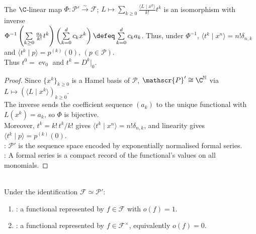 \begin{theorem} \label{thm:umbral-functional-series-isomorphism} \\
The $\C$-linear map $\Phi:\mathscr{P}'\xrightarrow{\sim}\mathscr{F}$; $L\longmapsto \sum\limits_{k\geq0}\frac{\langle L\mid x^k\rangle}{k!}t^k$ is an isomorphism with inverse\\
$\Phi^{-1}\left(\sum\limits_{k\geq0}\frac{a_k}{k!}t^k\right) \left(\sum\limits_{k=0}^{d}c_kx^k\right)\defeq \sum\limits_{k=0}^{d}c_ka_k$. Thus, under $\Phi^{-1}$, $\langle t^k\mid x^n\rangle=n!\delta_{n,k}$ and $\langle t^k\mid p\rangle=p^{(k)}(0)$, $(p\in\mathscr{P})$.\\
Thus $t^0=\operatorname{ev}_0$ and $t^k=D^k|_{0}$.
\begin{proof}
Since $\{x^k\}_{k\geq0}$ is a Hamel basis of $\mathscr{P}$, $\mathscr{P}'\cong\C^{\mathbb{N}}$ via $L\mapsto(\langle L\mid x^k\rangle)_{k\geq0}$.\\
The inverse sends the coefficient sequence $(a_k)$ to the unique functional with $L(x^k)=a_k$, so $\Phi$ is bijective.\\
Moreover, $t^k=k!\,t^k/k!$ gives $\langle t^k\mid x^n\rangle=n!\delta_{n,k}$, and linearity gives $\langle t^k\mid p\rangle=p^{(k)}(0)$.\\
: $\mathscr{P}'$ is the sequence space encoded by exponentially normalised formal series.\\
: A formal series is a compact record of the functional's values on all monomials.
\end{proof}
\end{theorem}

\begin{definition} \label{def:delta-and-invertible-functionals} \\
Under the identification $\mathscr{F}\simeq\mathscr{P}'$:
\begin{enumerate}[label=(\roman*)]
\setlength{\itemsep}{0pt}
\item {}: a functional represented by $f\in\mathscr{F}$ with $o(f)=1$.
\item {}: a functional represented by $f\in\mathscr{F}^{\times}$, equivalently $o(f)=0$.
\end{enumerate}
\end{definition}

